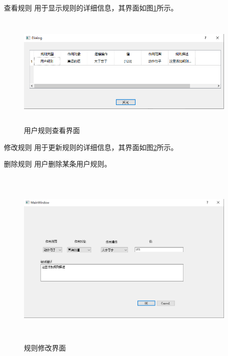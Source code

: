 		\begin{itemize}
			\item[查看规则]	
				用于显示规则的详细信息，其界面如图\ref{fig-gui-5}所示。
				\begin{figure}[htbp]
					\centering
					\includegraphics[width=5.77222in,height=2.15486in]{src/gui-5.png}
					\caption{用户规则查看界面}
					\label{fig-gui-5}
				\end{figure}
			\item[修改规则]
				用于更新规则的详细信息，其界面如图\ref{fig-gui-6}所示。
			\item[删除规则]
				用户删除某条用户规则。
				\begin{figure}[htbp]
					\centering
					\includegraphics[width=5.77222in,height=3.43681in]{src/gui-6.png}
					\caption{规则修改界面}
					\label{fig-gui-6}
				\end{figure}
		\end{itemize}


